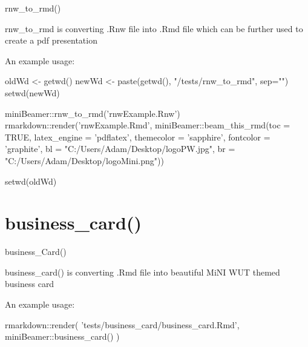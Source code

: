 \documentclass[ignorenonframetext,]{beamer}
\newenvironment{Shaded}{}{}
\newcommand{\KeywordTok}[1]{\textcolor[rgb]{0.00,0.00,1.00}{#1}}
\newcommand{\DataTypeTok}[1]{#1}
\newcommand{\StringTok}[1]{\textcolor[rgb]{0.00,0.50,0.50}{#1}}
\newcommand{\OtherTok}[1]{\textcolor[rgb]{1.00,0.25,0.00}{#1}}
\newcommand{\OperatorTok}[1]{#1}
\newcommand{\NormalTok}[1]{#1}
\begin{document}
\begin{frame}[fragile]{rnw\_to\_rmd()}

rnw\_to\_rmd is converting .Rnw file into .Rmd file which can be further
used to create a pdf presentation

An example usage:

\scriptsize

\begin{Shaded}
\begin{Highlighting}[]
\NormalTok{oldWd <-}\StringTok{ }\KeywordTok{getwd}\NormalTok{()}
\NormalTok{newWd <-}\StringTok{ }\KeywordTok{paste}\NormalTok{(}\KeywordTok{getwd}\NormalTok{(), }\StringTok{"/tests/rnw_to_rmd"}\NormalTok{, }\DataTypeTok{sep=}\StringTok{""}\NormalTok{)}
\KeywordTok{setwd}\NormalTok{(newWd)}

\NormalTok{miniBeamer}\OperatorTok{::}\KeywordTok{rnw_to_rmd}\NormalTok{(}\StringTok{'rnwExample.Rnw'}\NormalTok{)}
\NormalTok{rmarkdown}\OperatorTok{::}\KeywordTok{render}\NormalTok{(}\StringTok{'rnwExample.Rmd'}\NormalTok{, }
\NormalTok{                  miniBeamer}\OperatorTok{::}\KeywordTok{beam_this_rmd}\NormalTok{(}\DataTypeTok{toc =} \OtherTok{TRUE}\NormalTok{,}
                                            \DataTypeTok{latex_engine =} \StringTok{'pdflatex'}\NormalTok{,}
                                            \DataTypeTok{themecolor =} \StringTok{'sapphire'}\NormalTok{,}
                                            \DataTypeTok{fontcolor =} \StringTok{'graphite'}\NormalTok{,}
                                            \DataTypeTok{bl =} \StringTok{"C:/Users/Adam/Desktop/logoPW.jpg"}\NormalTok{,}
                                            \DataTypeTok{br =} \StringTok{"C:/Users/Adam/Desktop/logoMini.png"}\NormalTok{))}

\KeywordTok{setwd}\NormalTok{(oldWd)}
\end{Highlighting}
\end{Shaded}

\end{frame}

\section{business\_card()}\label{business_card}

\begin{frame}[fragile]{business\_Card()}

business\_card() is converting .Rmd file into beautiful MiNI WUT themed
business card

An example usage:

\scriptsize

\begin{Shaded}
\begin{Highlighting}[]
\NormalTok{rmarkdown}\OperatorTok{::}\KeywordTok{render}\NormalTok{(}
  \StringTok{'tests/business_card/business_card.Rmd'}\NormalTok{, miniBeamer}\OperatorTok{::}\KeywordTok{business_card}\NormalTok{()}
\NormalTok{)}
\end{Highlighting}
\end{Shaded}

\end{frame}
\end{document}
